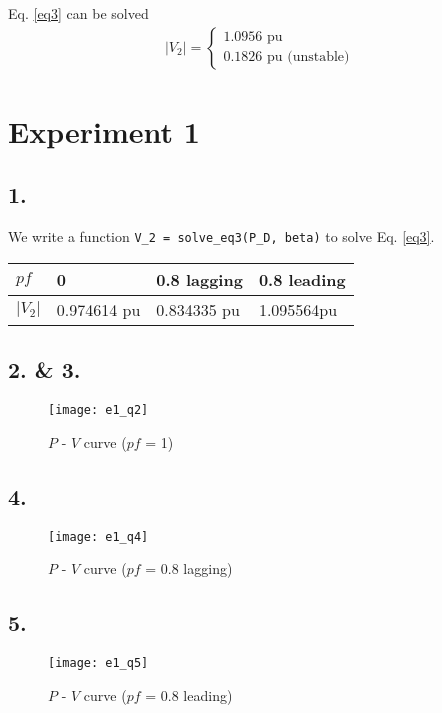 \documentclass{article}
\begin{document}
Eq. \ref{eq3} can be solved
\begin{align*}
|V_2| =
\begin{cases}
1.0956 \text{ pu}\\
0.1826 \text{ pu (unstable)}
\end{cases}
\end{align*}


\section*{Experiment 1}

\subsection*{1.}
We write a function \texttt{V\_2 = solve\_eq3(P\_D, beta)} to solve Eq. \ref{eq3}.\\

\begin{tabu} to \textwidth {XXXX}
\toprule
$pf$ &0 &0.8 lagging &0.8 leading\\
\hline
$|V_2|$ &0.974614 pu &0.834335 pu &1.095564pu\\
\bottomrule
\end{tabu}

\subsection*{2. \& 3.}
\begin{figure}[H]
\centering
\texttt{[image: e1\_q2]}
\caption{$P$ - $V$ curve ($pf$ = 1)}
\end{figure}

\subsection*{4.}
\begin{figure}[H]
\centering
\texttt{[image: e1\_q4]}
\caption{$P$ - $V$ curve ($pf$ = 0.8 lagging)}
\end{figure}

\subsection*{5.}
\begin{figure}[H]
\centering
\texttt{[image: e1\_q5]}
\caption{$P$ - $V$ curve ($pf$ = 0.8 leading)}
\end{figure}
\end{document}
